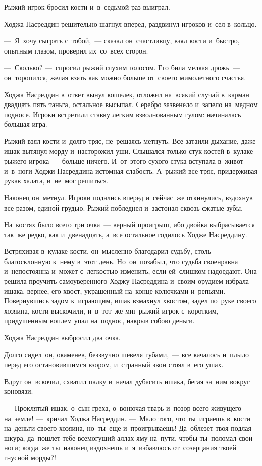 \documentclass[12pt,a4paper]{book}
\begin{document}
Рыжий игрок бросил кости и~в~седьмой раз выиграл.

Ходжа Насреддин решительно шагнул вперед, раздвинул игроков и~сел в~кольцо.

—~Я~хочу сыграть с~тобой,~— сказал он~счастливцу, взял кости и~быстро, опытным глазом, проверил их~со~всех сторон.

—~Сколько? —~спросил рыжий глухим голосом. Его била мелкая дрожь~— он~торопился, желая взять как можно больше от~своего мимолетного счастья.

Ходжа Насреддин в~ответ вынул кошелек, отложил на~всякий случай в~карман двадцать пять таньга, остальное высыпал. Серебро зазвенело и~запело на~медном подносе. Игроки встретили ставку легким взволнованным гулом: начиналась большая игра.

Рыжий взял кости и~долго тряс, не~решаясь метнуть. Все затаили дыхание, даже ишак вытянул морду и~насторожил уши. Слышался только стук костей в~кулаке рыжего игрока~— больше ничего. И~от~этого сухого стука вступала в~живот и~в~ноги Ходжи Насреддина истомная слабость. А~рыжий все тряс, придерживая рукав халата, и~не~мог решиться.

Наконец он~метнул. Игроки подались вперед и~сейчас~же откинулись, вздохнув все разом, единой грудью. Рыжий побледнел и~застонал сквозь сжатые зубы.

На~костях было всего три очка~— верный проигрыш, ибо двойка выбрасывается так~же редко, как и~двенадцать, а~все остальное годилось Ходже Насреддину.

Встряхивая в~кулаке кости, он~мысленно благодарил судьбу, столь благосклонную к~нему в~этот день. Но~он~позабыл, что судьба своенравна и~непостоянна и~может с~легкостью изменить, если ей~слишком надоедают. Она решила проучить самоуверенного Ходжу Насреддина и~своим орудием избрала ишака, вернее, его хвост, украшенный на~конце колючками и~репьями. Повернувшись задом к~играющим, ишак взмахнул хвостом, задел по~руке своего хозяина, кости выскочили, и~в~тот~же миг рыжий игрок с~коротким, придушенным воплем упал на~поднос, накрыв собою деньги.

Ходжа Насреддин выбросил два очка.

Долго сидел~он, окаменев, беззвучно шевеля губами,~— все качалось и~плыло перед его остановившимся взором, и~странный звон стоял в~его ушах.

Вдруг он~вскочил, схватил палку и~начал дубасить ишака, бегая за~ним вокруг коновязи.

—~Проклятый ишак, о~сын греха, о~вонючая тварь и~позор всего живущего на~земле! —~кричал Ходжа Насреддин. —~Мало того, что ты~играешь в~кости на~деньги своего хозяина, но~ты~еще и~проигрываешь! Да~облезет твоя подлая шкура, да~пошлет тебе всемогущий аллах яму на~пути, чтобы ты~поломал свои ноги; когда~же ты~наконец издохнешь и~я~избавлюсь от~созерцания твоей гнусной морды?!
\end{document}
